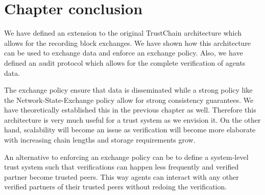 


\section{Chapter conclusion}
We have defined an extension to the original TrustChain architecture which allows for the recording
block exchanges. We have shown how this architecture can be used to exchange data and enforce an 
exchange policy. Also, we have defined an audit protocol which allows for the complete verification
of agents data. 

The exchange policy ensure that data is disseminated while a strong policy like the Network-State-Exchange
policy allow for strong consistency guarantees. We have theoretically established this in the 
previous chapter as well. Therefore this architecture is very much useful for a trust system as we
envision it. On the other hand, scalability will become an issue as verification will become more
elaborate with increasing chain lengths and storage requirements grow. 

An alternative to enforcing an exchange policy can be to define a system-level trust system such that
verifications can happen less frequently and verified partner become trusted peers. This way agents
can interact with any other verified partners of their trusted peers without redoing the verification.
